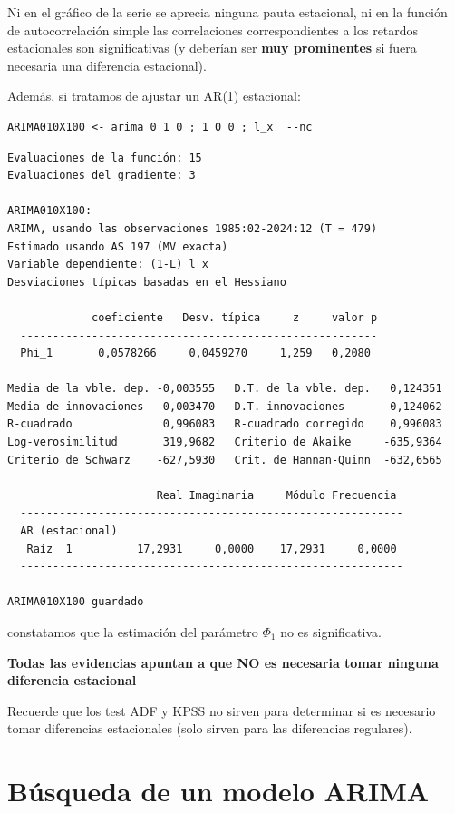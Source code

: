 \documentclass[10pt]{article}
\begin{document}
Ni en el gráfico de la serie se aprecia ninguna pauta estacional, ni
en la función de autocorrelación simple las correlaciones
correspondientes a los retardos estacionales son significativas (y
deberían ser \textbf{muy prominentes} si fuera necesaria una diferencia
estacional).

Además, si tratamos de ajustar un AR(1) estacional:

\begin{verbatim}
ARIMA010X100 <- arima 0 1 0 ; 1 0 0 ; l_x  --nc
\end{verbatim}

\begin{verbatim}
Evaluaciones de la función: 15
Evaluaciones del gradiente: 3

ARIMA010X100:
ARIMA, usando las observaciones 1985:02-2024:12 (T = 479)
Estimado usando AS 197 (MV exacta)
Variable dependiente: (1-L) l_x
Desviaciones típicas basadas en el Hessiano

             coeficiente   Desv. típica     z     valor p
  -------------------------------------------------------
  Phi_1       0,0578266     0,0459270     1,259   0,2080 

Media de la vble. dep. -0,003555   D.T. de la vble. dep.   0,124351
Media de innovaciones  -0,003470   D.T. innovaciones       0,124062
R-cuadrado              0,996083   R-cuadrado corregido    0,996083
Log-verosimilitud       319,9682   Criterio de Akaike     -635,9364
Criterio de Schwarz    -627,5930   Crit. de Hannan-Quinn  -632,6565

                       Real Imaginaria     Módulo Frecuencia
  -----------------------------------------------------------
  AR (estacional)
   Raíz  1          17,2931     0,0000    17,2931     0,0000
  -----------------------------------------------------------

ARIMA010X100 guardado
\end{verbatim}

constatamos que la estimación del parámetro \(\Phi_1\) no es
significativa.

\textbf{Todas las evidencias apuntan a que NO es necesaria tomar ninguna
diferencia estacional}

Recuerde que los test ADF y KPSS no sirven para determinar si es
necesario tomar diferencias estacionales (solo sirven para las
diferencias regulares).
\section*{Búsqueda de un modelo ARIMA}
\label{sec:org43f2d8d}
\end{document}
